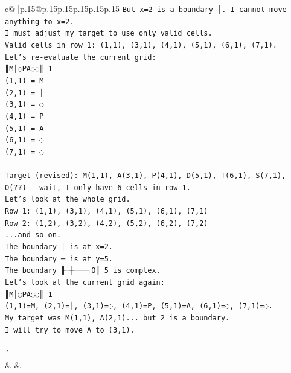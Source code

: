 \documentclass{article}
\begin{document}
{\begin{supertabular}{c@{$\;$}|p{.15\linewidth}@{}p{.15\linewidth}p{.15\linewidth}p{.15\linewidth}p{.15\linewidth}p{.15\linewidth}}
{{{\texttt{But x=2 is a boundary │. I cannot move anything to x=2.} \\
\texttt{I must adjust my target to use only valid cells.} \\
\texttt{Valid cells in row 1: (1,1), (3,1), (4,1), (5,1), (6,1), (7,1).} \\
\texttt{Let's re{-}evaluate the current grid:} \\
\texttt{║M│◌PA◌◌║ 1} \\
\texttt{(1,1) = M} \\
\texttt{(2,1) = │} \\
\texttt{(3,1) = ◌} \\
\texttt{(4,1) = P} \\
\texttt{(5,1) = A} \\
\texttt{(6,1) = ◌} \\
\texttt{(7,1) = ◌} \\
\\ 
\texttt{Target (revised): M(1,1), A(3,1), P(4,1), D(5,1), T(6,1), S(7,1), O(??) {-} wait, I only have 6 cells in row 1.} \\
\texttt{Let's look at the whole grid.} \\
\texttt{Row 1: (1,1), (3,1), (4,1), (5,1), (6,1), (7,1)} \\
\texttt{Row 2: (1,2), (3,2), (4,2), (5,2), (6,2), (7,2)} \\
\texttt{...and so on.} \\
\texttt{The boundary │ is at x=2.} \\
\texttt{The boundary ─ is at y=5.} \\
\texttt{The boundary ╟─┼───┐O║ 5 is complex.} \\
\texttt{Let's look at the current grid again:} \\
\texttt{║M│◌PA◌◌║ 1} \\
\texttt{(1,1)=M, (2,1)=│, (3,1)=◌, (4,1)=P, (5,1)=A, (6,1)=◌, (7,1)=◌.} \\
\texttt{My target was M(1,1), A(2,1)... but 2 is a boundary.} \\
\texttt{I will try to move A to (3,1).} \\
\\ 
\texttt{'} \\
            }
        }
    }
    & & \\ \\


\end{supertabular}}
\end{document}
